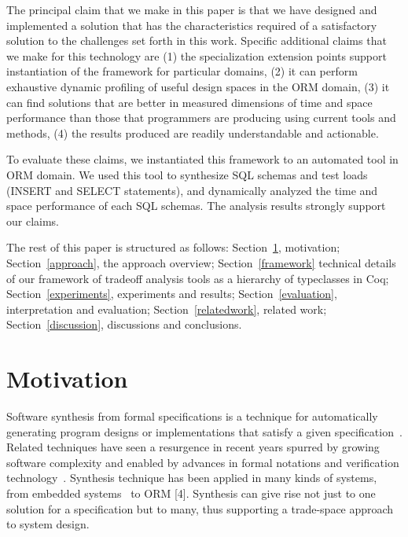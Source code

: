 The principal claim that we make in this paper is that we have designed and implemented a solution that has the characteristics required of a satisfactory solution to the challenges set forth in this work. Specific additional claims that we make for this technology are (1) the specialization extension points support instantiation of the framework for particular domains, (2) it can perform exhaustive dynamic profiling of useful design spaces in the ORM domain, (3) it can find solutions that are better in measured dimensions of time and space performance than those that programmers are producing using current tools and methods, (4) the results produced are readily understandable and actionable.

To evaluate these claims, we instantiated this framework to an automated tool in ORM domain. We used this tool to synthesize SQL schemas and test loads (INSERT and SELECT statements), and dynamically analyzed the time and space performance of each SQL schemas. The analysis results strongly support our claims.

The rest of this paper is structured as follows: Section~\ref{motivation}, motivation; Section~\ref{approach}, the approach overview; Section~\ref{framework} technical details of our framework of tradeoff analysis tools as a hierarchy of typeclasses in Coq; Section~\ref{experiments}, experiments and results; Section~\ref{evaluation}, interpretation and evaluation; Section~\ref{relatedwork}, related work; Section~\ref{discussion}, discussions and conclusions.

\section{Motivation}
\label{motivation}
Software synthesis from formal specifications is a technique for automatically generating program designs or implementations that satisfy a given specification~\cite{Manna:deductive_approach}. Related techniques have seen a resurgence in recent years spurred by growing software complexity and enabled by advances in formal notations and verification technology~\cite{Katebi:2011:SAT}. Synthesis technique has been applied in many kinds of systems, from embedded systems~\cite{Schirner:embedded} to ORM [4]. Synthesis can give rise not just to one solution for a specification but to many, thus supporting a trade-space approach to system design.

